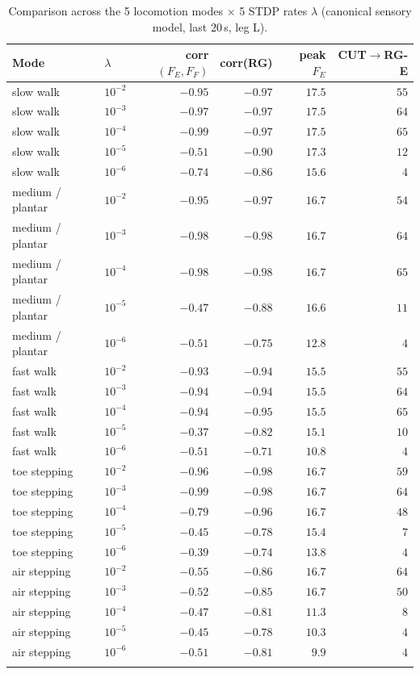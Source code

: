 \begin{table}[t]
  \centering
  \footnotesize
  \caption{Comparison across the 5 locomotion modes $\times$ 5 STDP rates $\lambda$ (canonical sensory model, last 20\,s, leg L).}
  \label{tab:mode_lambda}
  \begin{tabular}{ll rrrr}
    \toprule
    Mode & $\lambda$ & corr$(F_E,F_F)$ & corr(RG) & peak $F_E$ & CUT$\to$RG-E \\
    \midrule
    slow walk & $10^{-2}$ & $-0.95$ & $-0.97$ & $17.5$ & $55$ \\
    slow walk & $10^{-3}$ & $-0.97$ & $-0.97$ & $17.5$ & $64$ \\
    slow walk & $10^{-4}$ & $-0.99$ & $-0.97$ & $17.5$ & $65$ \\
    slow walk & $10^{-5}$ & $-0.51$ & $-0.90$ & $17.3$ & $12$ \\
    slow walk & $10^{-6}$ & $-0.74$ & $-0.86$ & $15.6$ & $4$ \\
    \addlinespace[2pt]
    medium / plantar & $10^{-2}$ & $-0.95$ & $-0.97$ & $16.7$ & $54$ \\
    medium / plantar & $10^{-3}$ & $-0.98$ & $-0.98$ & $16.7$ & $64$ \\
    medium / plantar & $10^{-4}$ & $-0.98$ & $-0.98$ & $16.7$ & $65$ \\
    medium / plantar & $10^{-5}$ & $-0.47$ & $-0.88$ & $16.6$ & $11$ \\
    medium / plantar & $10^{-6}$ & $-0.51$ & $-0.75$ & $12.8$ & $4$ \\
    \addlinespace[2pt]
    fast walk & $10^{-2}$ & $-0.93$ & $-0.94$ & $15.5$ & $55$ \\
    fast walk & $10^{-3}$ & $-0.94$ & $-0.94$ & $15.5$ & $64$ \\
    fast walk & $10^{-4}$ & $-0.94$ & $-0.95$ & $15.5$ & $65$ \\
    fast walk & $10^{-5}$ & $-0.37$ & $-0.82$ & $15.1$ & $10$ \\
    fast walk & $10^{-6}$ & $-0.51$ & $-0.71$ & $10.8$ & $4$ \\
    \addlinespace[2pt]
    toe stepping & $10^{-2}$ & $-0.96$ & $-0.98$ & $16.7$ & $59$ \\
    toe stepping & $10^{-3}$ & $-0.99$ & $-0.98$ & $16.7$ & $64$ \\
    toe stepping & $10^{-4}$ & $-0.79$ & $-0.96$ & $16.7$ & $48$ \\
    toe stepping & $10^{-5}$ & $-0.45$ & $-0.78$ & $15.4$ & $7$ \\
    toe stepping & $10^{-6}$ & $-0.39$ & $-0.74$ & $13.8$ & $4$ \\
    \addlinespace[2pt]
    air stepping & $10^{-2}$ & $-0.55$ & $-0.86$ & $16.7$ & $64$ \\
    air stepping & $10^{-3}$ & $-0.52$ & $-0.85$ & $16.7$ & $50$ \\
    air stepping & $10^{-4}$ & $-0.47$ & $-0.81$ & $11.3$ & $8$ \\
    air stepping & $10^{-5}$ & $-0.45$ & $-0.78$ & $10.3$ & $4$ \\
    air stepping & $10^{-6}$ & $-0.51$ & $-0.81$ & $9.9$ & $4$ \\
    \addlinespace[2pt]
    \bottomrule
  \end{tabular}
\end{table}
